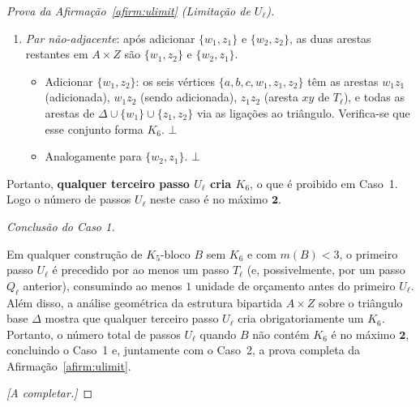 \documentclass[reqno, 12pt]{amsart}
\numberwithin{equation}{section}
\theoremstyle{plain}
\theoremstyle{definition}
\newcommand{\maxdens}{m}
\begin{document}
\begin{proof}[Prova da Afirmação~\ref{afirm:ulimit} (Limitação de $U_\ell$)]
\begin{enumerate}
  \item \emph{Par não-adjacente}: após adicionar $\{w_1,z_1\}$ e $\{w_2,z_2\}$, as
    duas arestas restantes em $A \times Z$ são $\{w_1,z_2\}$ e $\{w_2,z_1\}$.
    \begin{itemize}
      \item Adicionar $\{w_1,z_2\}$: os seis vértices $\{a,b,c,w_1,z_1,z_2\}$ têm
        as arestas $w_1 z_1$ (adicionada), $w_1 z_2$ (sendo adicionada),
        $z_1 z_2$ (aresta $xy$ de $T_\ell$), e todas as arestas de
        $\Delta \cup \{w_1\} \cup \{z_1,z_2\}$ via as ligações ao triângulo.
        Verifica-se que esse conjunto forma $K_6$. $\bot$
      \item Analogamente para $\{w_2,z_1\}$. $\bot$
    \end{itemize}
\end{enumerate}
Portanto, \textbf{qualquer terceiro passo $U_\ell$ cria $K_6$}, o que é proibido
em Caso~1. Logo o número de passos $U_\ell$ neste caso é no máximo $\mathbf{2}$.

\medskip
\noindent\textit{Conclusão do Caso 1.}

Em qualquer construção de $K_5$-bloco $B$ sem $K_6$ e com $\maxdens(B) < 3$,
o primeiro passo $U_\ell$ é precedido por ao menos um passo $T_\ell$ (e,
possivelmente, por um passo $Q_\ell$ anterior), consumindo ao menos $1$ unidade
de orçamento antes do primeiro $U_\ell$. Além disso, a análise geométrica
da estrutura bipartida $A \times Z$ sobre o triângulo base $\Delta$ mostra
que qualquer terceiro passo $U_\ell$ cria obrigatoriamente um $K_6$. Portanto,
o número total de passos $U_\ell$ quando $B$ não contém $K_6$ é no máximo
$\mathbf{2}$, concluindo o Caso~1 e, juntamente com o Caso~2, a prova completa
da Afirmação~\ref{afirm:ulimit}. 
\medskip

\emph{[A completar.]}
\end{proof}




\vspace{1cm}

\printbibliography
\end{document}

